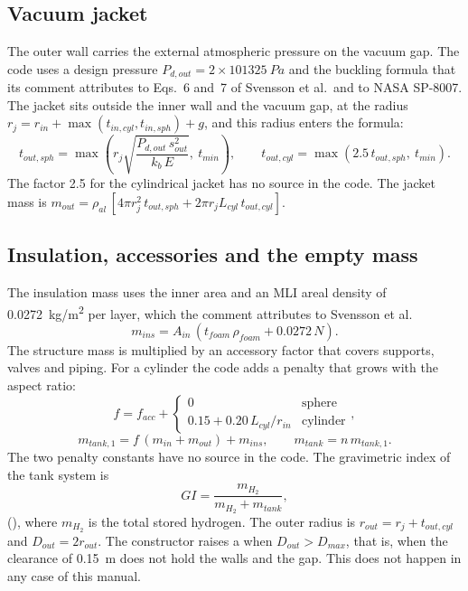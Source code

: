 \documentclass[a4paper,11pt]{article}
\begin{document}
\subsection{Vacuum jacket}\label{sec:outer}
The outer wall carries the external atmospheric pressure on the vacuum gap. The code uses a
design pressure $P_{d,out} = 2 \times \SI{101325}{Pa}$ and the buckling formula that its comment
attributes to Eqs.~6 and~7 of Svensson et al.\ and to NASA SP-8007. The
jacket sits outside the inner wall and the vacuum gap, at the radius
$r_j = r_{in} + \max(t_{in,cyl}, t_{in,sph}) + g$, and this radius enters the formula:
\begin{equation}
  t_{out,sph} = \max\!\left(r_j\sqrt{\frac{P_{d,out}\, s_{out}^2}{k_b\, E}},\ t_{min}\right),
  \qquad
  t_{out,cyl} = \max\!\left(2.5\, t_{out,sph},\ t_{min}\right).
  \label{eq:touter}
\end{equation}
The factor 2.5 for the cylindrical jacket has no source in the code. The jacket mass is
$m_{out} = \rho_{al}\,[4\pi r_j^2\, t_{out,sph} + 2\pi r_j L_{cyl}\, t_{out,cyl}]$.

\subsection{Insulation, accessories and the empty mass}\label{sec:mass}
The insulation mass uses the inner area and an MLI areal density of
\SI{0.0272}{kg/m^2} per layer, which the comment attributes to Svensson et al.\:
\begin{equation}
  m_{ins} = A_{in}\,(t_{foam}\,\rho_{foam} + 0.0272\,N).
\end{equation}
The structure mass is multiplied by an accessory factor that covers supports, valves and
piping. For a cylinder the code adds a penalty that grows with the aspect ratio:
\begin{equation}
  f = f_{acc} + \begin{cases} 0 & \text{sphere}\\ 0.15 + 0.20\,L_{cyl}/r_{in} & \text{cylinder}\end{cases},
  \label{eq:accfactor}
\end{equation}
\begin{equation}
  m_{tank,1} = f\,(m_{in} + m_{out}) + m_{ins},
  \qquad
  m_{tank} = n\, m_{tank,1}.
  \label{eq:mass}
\end{equation}
The two penalty constants have no source in the code. The gravimetric index of the tank system is
\begin{equation}
  GI = \frac{m_{H_2}}{m_{H_2} + m_{tank}},
  \label{eq:gi}
\end{equation}
(), where $m_{H_2}$ is the total stored hydrogen. The outer radius is
$r_{out} = r_j + t_{out,cyl}$ and $D_{out} = 2 r_{out}$. The constructor
raises a  when $D_{out} > D_{max}$, that is, when the clearance of
\SI{0.15}{m} does not hold the walls and the gap. This does not happen in any case of this
manual.
\end{document}
